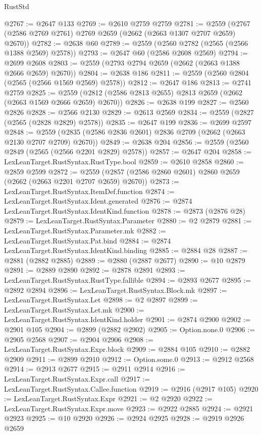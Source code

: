 \begin{lexlean}{RustStd}
\begin{coremodule}
@2767 := @2647 @133
@2769 := @2610 @2759 @2759
@2781 := @2559 (@2767 (@2586 @2769 @2761) @2769 @2659 (@2662 (@2663 @1307 @2707 @2659) @2670))
@2782 := @2638 @60
@2789 := @2559 (@2560 @2782 (@2565 (@2566 @1388 @2569) @2578))
@2793 := @2647 @60 (@2586 @2608 @2569)
@2794 := @2699 @2608
@2803 := @2559 (@2793 @2794 @2659 (@2662 (@2663 @1388 @2666 @2659) @2670))
@2804 := @2638 @186
@2811 := @2559 (@2560 @2804 (@2565 (@2566 @1569 @2569) @2578))
@2812 := @2647 @186
@2813 := @2741 @2759
@2825 := @2559 (@2812 (@2586 @2813 @2655) @2813 @2659 (@2662 (@2663 @1569 @2666 @2659) @2670))
@2826 := @2638 @199
@2827 := @2560 @2826
@2828 := @2566 @2130
@2829 := @2613 @2569
@2834 := @2559 (@2827 (@2565 (@2828 @2829) @2578))
@2835 := @2647 @199
@2836 := @2699 @2597
@2848 := @2559 (@2835 (@2586 @2836 @2601) @2836 @2709 (@2662 (@2663 @2130 @2707 @2709) @2670))
@2849 := @2638 @204
@2856 := @2559 (@2560 @2849 (@2565 (@2566 @2201 @2829) @2578))
@2857 := @2647 @204
@2858 := LexLeanTarget.RustSyntax.RustType.bool
@2859 := @2610 @2858
@2860 := @2859 @2599
@2872 := @2559 (@2857 (@2586 @2860 @2601) @2860 @2659 (@2662 (@2663 @2201 @2707 @2659) @2670))
@2873 := LexLeanTarget.RustSyntax.ItemDef.function
@2874 := LexLeanTarget.RustSyntax.Ident.generated
@2876 := @2874 LexLeanTarget.RustSyntax.IdentKind.function
@2878 := @2873 (@2876 @28)
@2879 := LexLeanTarget.RustSyntax.Parameter
@2880 := @2 @2879
@2881 := LexLeanTarget.RustSyntax.Parameter.mk
@2882 := LexLeanTarget.RustSyntax.Pat.bind
@2884 := @2874 LexLeanTarget.RustSyntax.IdentKind.binding
@2885 := @2884 @28
@2887 := @2881 (@2882 @2885)
@2889 := @2880 (@2887 @2677)
@2890 := @10 @2879
@2891 := @2889 @2890
@2892 := @2878 @2891
@2893 := LexLeanTarget.RustSyntax.RustType.fallible
@2894 := @2893 @2677
@2895 := @2892 @2894
@2896 := LexLeanTarget.RustSyntax.Block.mk
@2897 := LexLeanTarget.RustSyntax.Let
@2898 := @2 @2897
@2899 := LexLeanTarget.RustSyntax.Let.mk
@2900 := LexLeanTarget.RustSyntax.IdentKind.holder
@2901 := @2874 @2900
@2902 := @2901 @105
@2904 := @2899 (@2882 @2902)
@2905 := Option.none.{0}
@2906 := @2905 @2568
@2907 := @2904 @2906
@2908 := LexLeanTarget.RustSyntax.Expr.block
@2909 := @2884 @105
@2910 := @2882 @2909
@2911 := @2899 @2910
@2912 := Option.some.{0}
@2913 := @2912 @2568
@2914 := @2913 @2677
@2915 := @2911 @2914
@2916 := LexLeanTarget.RustSyntax.Expr.call
@2917 := LexLeanTarget.RustSyntax.Callee.function
@2919 := @2916 (@2917 @105)
@2920 := LexLeanTarget.RustSyntax.Expr
@2921 := @2 @2920
@2922 := LexLeanTarget.RustSyntax.Expr.move
@2923 := @2922 @2885
@2924 := @2921 @2923
@2925 := @10 @2920
@2926 := @2924 @2925
@2928 := @2919 @2926 @2659

\end{coremodule}
\end{lexlean}
